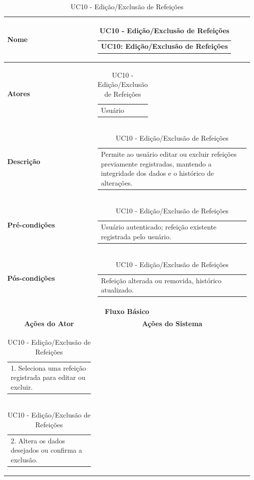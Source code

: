 \begin{longtable}[c]{|p{}|p{}|}
\caption{UC10 - Edição/Exclusão de Refeições}
\label{tab:uc10}\\
\hline
\multicolumn{1}{|p{0.48\textwidth}|}{\textbf{Nome}} &
  \begin{tabular}[c]{@{}p{}@{}}UC10: Edição/Exclusão de Refeições\end{tabular} \\ \hline
\endfirsthead
\endhead

\multicolumn{1}{|p{0.48\textwidth}|}{\textbf{Atores}} &
  \begin{tabular}[c]{@{}p{}@{}}Usuário\end{tabular} \\ \hline
\multicolumn{1}{|p{0.48\textwidth}|}{\textbf{Descrição}} &
  \begin{tabular}[c]{@{}p{}@{}}Permite ao usuário editar ou excluir refeições previamente registradas, mantendo a integridade dos dados e o histórico de alterações.\end{tabular} \\ \hline
\multicolumn{1}{|p{0.48\textwidth}|}{\textbf{Pré-condições}} &
  \begin{tabular}[c]{@{}p{}@{}}Usuário autenticado; refeição existente registrada pelo usuário.\end{tabular} \\ \hline
\multicolumn{1}{|p{0.48\textwidth}|}{\textbf{Pós-condições}} &
  \begin{tabular}[c]{@{}p{}@{}}Refeição alterada ou removida, histórico atualizado.\end{tabular} \\ \hline
\multicolumn{2}{|c|}{\textbf{Fluxo Básico}} \\ \hline
\multicolumn{1}{|c|}{\textbf{Ações do Ator}} &
  \multicolumn{1}{c|}{\textbf{Ações do Sistema}} \\ \hline
\multicolumn{1}{|p{0.48\textwidth}|}{\begin{tabular}[c]{@{}p{}@{}}1. Seleciona uma refeição registrada para editar ou excluir.\end{tabular}} & \\ \hline
\multicolumn{1}{|p{0.48\textwidth}|}{\begin{tabular}[c]{@{}p{}@{}}2. Altera os dados desejados ou confirma a exclusão.\end{tabular}} & \\ \hline

\end{longtable}

